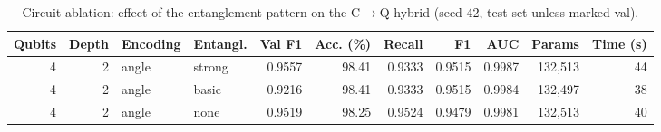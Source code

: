 \begin{table}[htbp]
\centering
\footnotesize
\caption{Circuit ablation: effect of the entanglement pattern on the C$\rightarrow$Q hybrid (seed 42, test set unless marked val).}
\label{tab:abl_ent}
\begin{adjustbox}{max width=\linewidth}
\begin{tabular}{rrllrrrrrrr}
\toprule
Qubits & Depth & Encoding & Entangl. & Val F1 & Acc. (\%) & Recall & F1 & AUC & Params & Time (s) \\
\midrule
4 & 2 & angle & strong & 0.9557 & 98.41 & 0.9333 & 0.9515 & 0.9987 & 132,513 & 44 \\
4 & 2 & angle & basic & 0.9216 & 98.41 & 0.9333 & 0.9515 & 0.9984 & 132,497 & 38 \\
4 & 2 & angle & none & 0.9519 & 98.25 & 0.9524 & 0.9479 & 0.9981 & 132,513 & 40 \\
\bottomrule
\end{tabular}
\end{adjustbox}
\end{table}
